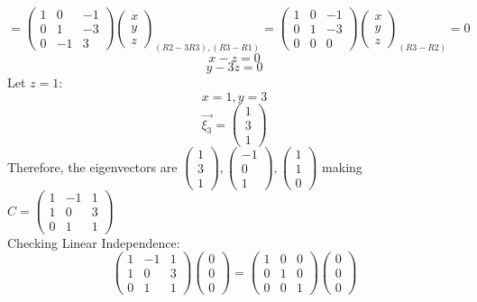 \documentclass[11pt]{article}
\begin{document}
\[=
\begin{pmatrix}
1 & 0 & -1\\
0 & 1 & -3\\
0 & -1 & 3
\end{pmatrix}
\begin{pmatrix}
x\\
y\\
z
\end{pmatrix}_{(R2-3R3),(R3-R1)}=
\begin{pmatrix}
1 & 0 & -1\\
0 & 1 & -3\\
0 & 0 & 0
\end{pmatrix}
\begin{pmatrix}
x\\
y\\
z
\end{pmatrix}_{(R3-R2)}=0\]
\[x-z=0\]
\[y-3z=0\]
Let $z=1$:
\[x=1, y=3\]
\[\Vec{\xi_3}=
\begin{pmatrix}
1\\
3\\
1
\end{pmatrix}\]
Therefore, the eigenvectors are $\begin{pmatrix}
1\\
3\\
1
\end{pmatrix},
\begin{pmatrix}
-1\\
0\\
1
\end{pmatrix},
\begin{pmatrix}
1\\
1\\
0
\end{pmatrix}$ making $C=\begin{pmatrix}
1 & -1 & 1\\
1 & 0 & 3\\
0 & 1 & 1
\end{pmatrix}$\\
Checking Linear Independence:
\[\begin{pmatrix}
1 & -1 & 1\\
1 & 0 & 3\\
0 & 1 & 1
\end{pmatrix}
\begin{pmatrix}
0\\
0\\
0
\end{pmatrix}=
\begin{pmatrix}
1 & 0 & 0\\
0 & 1 & 0\\
0 & 0 & 1
\end{pmatrix}\begin{pmatrix}
0\\
0\\
0
\end{pmatrix}\]
\end{document}
